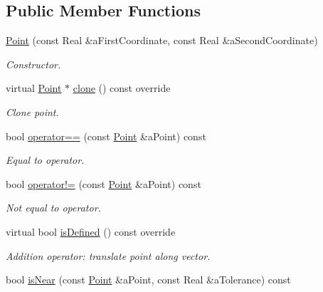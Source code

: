 \subsection*{Public Member Functions}
\begin{DoxyCompactItemize}
\item 
\hyperlink{classostk_1_1math_1_1geom_1_1d2_1_1objects_1_1_point_ad4252af4171fbe3cff37ada7827e1966}{Point} (const Real \&a\+First\+Coordinate, const Real \&a\+Second\+Coordinate)
\begin{DoxyCompactList}\small\item\em Constructor. \end{DoxyCompactList}\item 
virtual \hyperlink{classostk_1_1math_1_1geom_1_1d2_1_1objects_1_1_point}{Point} $\ast$ \hyperlink{classostk_1_1math_1_1geom_1_1d2_1_1objects_1_1_point_a8550e9fe2c23c1f38e53093f4480598d}{clone} () const override
\begin{DoxyCompactList}\small\item\em Clone point. \end{DoxyCompactList}\item 
bool \hyperlink{classostk_1_1math_1_1geom_1_1d2_1_1objects_1_1_point_ad4dc9ca78b90f6c4a7e5da64a57b5d1f}{operator==} (const \hyperlink{classostk_1_1math_1_1geom_1_1d2_1_1objects_1_1_point}{Point} \&a\+Point) const
\begin{DoxyCompactList}\small\item\em Equal to operator. \end{DoxyCompactList}\item 
bool \hyperlink{classostk_1_1math_1_1geom_1_1d2_1_1objects_1_1_point_a2dd21e17403fe735ed517ef7f4212de2}{operator!=} (const \hyperlink{classostk_1_1math_1_1geom_1_1d2_1_1objects_1_1_point}{Point} \&a\+Point) const
\begin{DoxyCompactList}\small\item\em Not equal to operator. \end{DoxyCompactList}\item 
virtual bool \hyperlink{classostk_1_1math_1_1geom_1_1d2_1_1objects_1_1_point_a245dd2f0268e1f162804489ac911cb0c}{is\+Defined} () const override
\begin{DoxyCompactList}\small\item\em Addition operator\+: translate point along vector. \end{DoxyCompactList}\item 
bool \hyperlink{classostk_1_1math_1_1geom_1_1d2_1_1objects_1_1_point_aa9be8a5dd8b6d33398e0aba89308c71f}{is\+Near} (const \hyperlink{classostk_1_1math_1_1geom_1_1d2_1_1objects_1_1_point}{Point} \&a\+Point, const Real \&a\+Tolerance) const

\end{DoxyCompactItemize}
